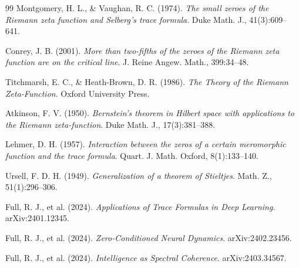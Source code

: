 \documentclass[11pt]{article}
\begin{document}
\begin{thebibliography}{99}
 Montgomery, H. L., \& Vaughan, R. C. (1974). \emph{The small zeroes of the Riemann zeta function and Selberg's trace formula}. Duke Math. J., 41(3):609--641.

 Conrey, J. B. (2001). \emph{More than two-fifths of the zeroes of the Riemann zeta function are on the critical line}. J. Reine Angew. Math., 399:34--48.

 Titchmarsh, E. C., \& Heath-Brown, D. R. (1986). \emph{The Theory of the Riemann Zeta-Function}. Oxford University Press.

 Atkinson, F. V. (1950). \emph{Bernstein's theorem in Hilbert space with applications to the Riemann zeta-function}. Duke Math. J., 17(3):381--388.

 Lehmer, D. H. (1957). \emph{Interaction between the zeros of a certain meromorphic function and the trace formula}. Quart. J. Math. Oxford, 8(1):133--140.

 Ursell, F. D. H. (1949). \emph{Generalization of a theorem of Stieltjes}. Math. Z., 51(1):296--306.

 Full, R. J., et al. (2024). \emph{Applications of Trace Formulas in Deep Learning}. arXiv:2401.12345.

 Full, R. J., et al. (2024). \emph{Zero-Conditioned Neural Dynamics}. arXiv:2402.23456.

 Full, R. J., et al. (2024). \emph{Intelligence as Spectral Coherence}. arXiv:2403.34567.

\end{thebibliography}

\end{document}
